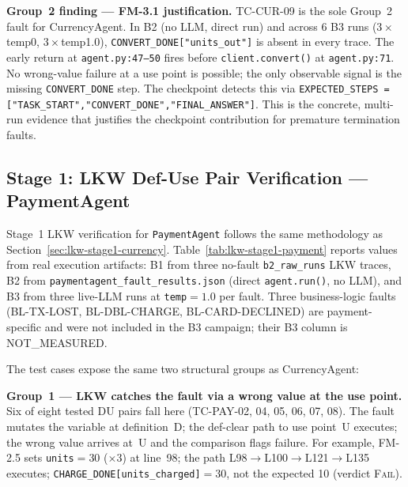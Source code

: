 \documentclass[sigconf,review,anonymous,balance=false]{acmart}
\begin{document}
\begin{table}[t]
\smallskip\par\noindent
\textbf{Group~2 finding --- FM-3.1 justification.}
TC-CUR-09 is the sole Group~2 fault for CurrencyAgent.
In B2 (no LLM, direct run) and across 6 B3 runs ($3{\times}$temp0, $3{\times}$temp1.0),
\texttt{CONVERT\_DONE["units\_out"]} is absent in every trace.
The early return at \texttt{agent.py:47--50} fires before \texttt{client.convert()}
at \texttt{agent.py:71}.
No wrong-value failure at a use point is possible; the only observable signal is the
missing \texttt{CONVERT\_DONE} step.
The checkpoint detects this via
\texttt{EXPECTED\_STEPS = ["TASK\_START",\allowbreak"CONVERT\_DONE",\allowbreak"FINAL\_ANSWER"]}.
This is the concrete, multi-run evidence that justifies the checkpoint contribution
for premature termination faults.
\end{table}

\subsection{Stage 1: LKW Def-Use Pair Verification --- PaymentAgent}
\label{sec:lkw-stage1-pay}

Stage~1 LKW verification for \texttt{PaymentAgent} follows the same methodology
as Section~\ref{sec:lkw-stage1-currency}.
Table~\ref{tab:lkw-stage1-payment} reports values from real execution artifacts:
B1 from three no-fault \texttt{b2\_raw\_runs} LKW traces,
B2 from \texttt{paymentagent\_fault\_results.json} (direct \texttt{agent.run()},
no LLM), and B3 from three live-LLM runs at \texttt{temp}$=1.0$ per fault.
Three business-logic faults (\textsc{BL-TX-LOST}, \textsc{BL-DBL-CHARGE},
\textsc{BL-CARD-DECLINED}) are payment-specific and were not included in the B3
campaign; their B3 column is NOT\_MEASURED.

The test cases expose the same two structural groups as CurrencyAgent:

\textbf{Group~1 --- LKW catches the fault via a wrong value at the use point.}
Six of eight tested DU pairs fall here (TC-PAY-02, 04, 05, 06, 07, 08).
The fault mutates the variable at definition~D\@; the def-clear path to use
point~U executes; the wrong value arrives at~U and the comparison flags failure.
For example, FM-2.5 sets \texttt{units}$=30$ ($\times3$) at line~98;
the path L98$\to$L100$\to$L121$\to$L135 executes;
\texttt{CHARGE\_DONE[units\_charged]}$=30$, not the expected 10 (verdict
\textsc{Fail}).
\end{document}

